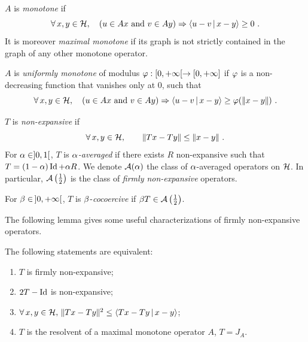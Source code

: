\begin{definition}
$A$ is \textit{monotone} if 
%
\[
	\forall \, x,y \in \mathcal{H}, \quad \left(  u \in Ax ~\text{and}~ v \in Ay  \right) \Rightarrow \left\langle u - v\,\middle|\,x - y\right\rangle \geq 0~.
\]
%
It is moreover \textit{maximal monotone} if its graph is not strictly contained in the graph of any other monotone operator.
\end{definition}

\begin{definition}
$A$ is \textit{uniformly monotone} of modulus $\varphi: [0,{+}\infty[ \to [0,{+}\infty]$ if $\varphi$ is a non-decreasing function that vanishes only at 0, such that
%
\[
	\forall \, x,y \in \mathcal{H}, \quad \left(  u \in Ax ~\text{and}~ v \in Ay  \right) \Rightarrow  \left\langle u - v\,\middle|\,x - y\right\rangle \geq \varphi(|\kern-1pt| x - y |\kern-1pt|)~.
\]
%
\end{definition}
 
\begin{definition}
$T$ is \textit{non-expansive} if 
%
\[ \forall \, x,y \in \mathcal{H}, \qquad |\kern-1pt| Tx - Ty |\kern-1pt| \leq |\kern-1pt| x - y |\kern-1pt| ~. \]
%
For $\alpha \in ]0,1[$, $T$ is \textit{$\alpha$-averaged} if there exists $R$ non-expansive such that $T = (1-\alpha) \operatorname{Id} + \alpha R$. We denote $\mathcal{A}(\alpha)$ the class of $\alpha$-averaged operators on $\mathcal{H}$. In particular, $\mathcal{A}\left(  {\textstyle \frac{1}{2}}  \right)$ is the class of \textit{firmly non-expansive} operators.
\end{definition}

\begin{definition}
For $\beta \in \, ]0,{+}\infty[$, $T$ is $\beta$-\textit{cocoercive} if $\beta T \in \mathcal{A}\left(  {\textstyle \frac{1}{2}}  \right)$.
\end{definition}

The following lemma gives some useful characterizations of firmly non-expansive operators.

\begin{lemma} The following statements are equivalent:
\begin{enumerate}[label={\rm (\roman{*})}, ref={\rm (\roman{*})}]
\item{\label{fne}} $T$ is firmly non-expansive;
\item{\label{refl}} $2T-\operatorname{Id}$ is non-expansive;
\item{\label{1-coco}} $\forall \, x,y \in \mathcal{H}, \, |\kern-1pt| Tx - Ty |\kern-1pt|^2 \leq \left\langle Tx - Ty\,\middle|\,x - y\right\rangle$;
\item{\label{resolv}} $T$ is the resolvent of a maximal monotone operator $A$, \ie $T = J_{A}$.
\end{enumerate} 
\label{lem:fne}
\end{lemma}

